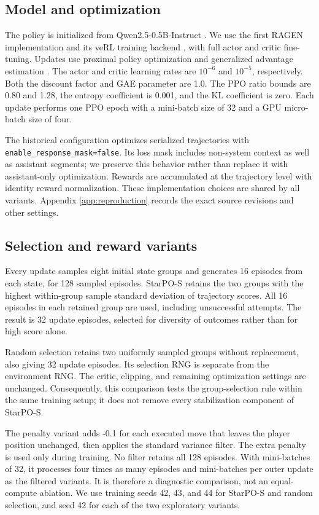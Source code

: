 \documentclass[10pt,twocolumn,letterpaper]{article}
\begin{document}
\subsection{Model and optimization}
The policy is initialized from Qwen2.5-0.5B-Instruct \citep{qwen}. We use the first RAGEN implementation and its veRL training backend \citep{hybridflow}, with full actor and critic fine-tuning. Updates use proximal policy optimization \citep{ppo} and generalized advantage estimation \citep{gae}. The actor and critic learning rates are $10^{-6}$ and $10^{-5}$, respectively. Both the discount factor and GAE parameter are 1.0. The PPO ratio bounds are 0.80 and 1.28, the entropy coefficient is 0.001, and the KL coefficient is zero. Each update performs one PPO epoch with a mini-batch size of 32 and a GPU micro-batch size of four.

The historical configuration optimizes serialized trajectories with \texttt{enable\_response\_mask=false}. Its loss mask includes non-system context as well as assistant segments; we preserve this behavior rather than replace it with assistant-only optimization. Rewards are accumulated at the trajectory level with identity reward normalization. These implementation choices are shared by all variants. Appendix \ref{app:reproduction} records the exact source revisions and other settings.

\subsection{Selection and reward variants}
Every update samples eight initial state groups and generates 16 episodes from each state, for 128 sampled episodes. StarPO-S retains the two groups with the highest within-group sample standard deviation of trajectory scores. All 16 episodes in each retained group are used, including unsuccessful attempts. The result is 32 update episodes, selected for diversity of outcomes rather than for high score alone.

Random selection retains two uniformly sampled groups without replacement, also giving 32 update episodes. Its selection RNG is separate from the environment RNG. The critic, clipping, and remaining optimization settings are unchanged. Consequently, this comparison tests the group-selection rule within the same training setup; it does not remove every stabilization component of StarPO-S.

The penalty variant adds -0.1 for each executed move that leaves the player position unchanged, then applies the standard variance filter. The extra penalty is used only during training. No filter retains all 128 episodes. With mini-batches of 32, it processes four times as many episodes and mini-batches per outer update as the filtered variants. It is therefore a diagnostic comparison, not an equal-compute ablation. We use training seeds 42, 43, and 44 for StarPO-S and random selection, and seed 42 for each of the two exploratory variants.
\end{document}
